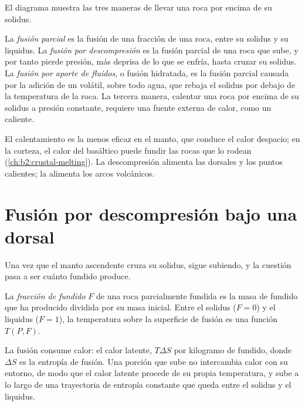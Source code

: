 El diagrama muestra las tres maneras de llevar una roca por encima de su solidus.

\begin{definition}\label{def:b2:mantle-melting:melting}
La \emph{fusión parcial} es la fusión de una fracción de una
roca, entre su solidus y su liquidus. La \emph{fusión por
descompresión} es la fusión parcial de una roca que sube,
y por tanto pierde presión, más deprisa de lo que se enfría, hasta cruzar su solidus.
La \emph{fusión por aporte de fluidos},
o fusión hidratada, es la fusión parcial causada por la adición de un volátil,
sobre todo agua, que rebaja el solidus por debajo de la temperatura de la roca. La tercera
manera, calentar una roca por encima de su solidus a presión constante, requiere una fuente
externa de calor, como un  caliente.
\end{definition}

El calentamiento es la menos eficaz en el manto, que conduce el calor despacio; en la
corteza, el calor del  basáltico puede fundir las rocas que lo rodean
(\cref{ch:b2:crustal-melting}). La descompresión alimenta las dorsales y los puntos calientes;
la  alimenta los arcos volcánicos.

\section{Fusión por descompresión bajo una dorsal}\label{sec:b2:mantle-melting:decompression}

Una vez que el manto ascendente cruza su solidus, sigue subiendo, y la cuestión
pasa a ser cuánto fundido produce.

\begin{definition}\label{def:b2:mantle-melting:fraction}
La \emph{fracción de fundido} $F$ de una roca parcialmente fundida es
la masa de fundido que ha producido dividida por su masa inicial. Entre el solidus
($F = 0$) y el liquidus ($F = 1$), la temperatura sobre la superficie de fusión es una
función $T(P, F)$.
\end{definition}

La fusión consume calor: el calor latente, $T\Delta S$ por kilogramo de fundido, donde
$\Delta S$ es la entropía de fusión. Una porción que sube no intercambia calor con su
entorno, de modo que el calor latente procede de su propia temperatura, y sube
a lo largo de una trayectoria de entropía constante que queda entre el solidus y el liquidus.

